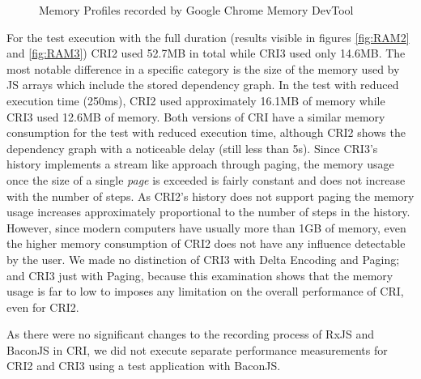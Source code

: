 \begin{figure}[!h]
		\caption{Memory Profiles recorded by Google Chrome Memory DevTool}
	\end{figure}
	
	For the test execution with the full duration (results visible in figures \ref{fig:RAM2} and \ref{fig:RAM3}) CRI2 used 52.7MB in total while CRI3 used only 14.6MB. The most notable difference in a specific category is the size of the memory used by JS arrays which include the stored dependency graph. In the test with reduced execution time (250ms), CRI2 used approximately 16.1MB of memory while CRI3 used 12.6MB of memory. Both versions of CRI have a similar memory consumption for the test with reduced execution time, although CRI2 shows the dependency graph with a noticeable delay (still less than 5s). Since CRI3's history implements a stream like approach through paging, the memory usage once the size of a single \emph{page} is exceeded is fairly constant and does not increase with the number of steps. As CRI2's history does not support paging the memory usage increases approximately proportional to the number of steps in the history. However, since modern computers have usually more than 1GB of memory, even the higher memory consumption of CRI2 does not have any influence detectable by the user. We made no distinction of CRI3 with Delta Encoding and Paging; and CRI3 just with Paging, because this examination shows that the memory usage is far to low to  imposes any limitation on the overall performance of CRI, even for CRI2.
	
	As there were no significant changes to the recording process of RxJS and BaconJS in CRI, we did not execute separate performance measurements for CRI2 and CRI3 using a test application with BaconJS.
	
